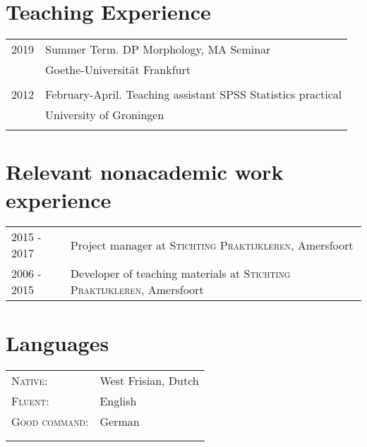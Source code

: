 \documentclass[12pt]{article}
\begin{document}
\section{Teaching Experience}
\begin{tabular}{p{3cm}l}
	\textsc{2019} & Summer Term. DP Morphology, MA Seminar\\
	& Goethe-Universität Frankfurt\\\multicolumn{2}{c}{} \\
	\textsc{2012} & February-April. Teaching assistant SPSS Statistics practical\\
	& University of Groningen\\\multicolumn{2}{c}{} \\
\end{tabular}

\section{Relevant nonacademic work experience}
\begin{tabular}{p{3cm}l}
\textsc{2015 - 2017} & Project manager at \textsc{Stichting Praktijkleren}, Amersfoort\\
\textsc{2006 - 2015} & Developer of teaching materials at \textsc{Stichting Praktijkleren}, Amersfoort\\
\end{tabular}

\section{Languages}
\begin{tabular}{p{3cm}l}
\textsc{Native}: &West Frisian, Dutch\\
\textsc{Fluent}: &English\\
\textsc{Good command}: &German\\&\\&\\
\end{tabular}
\end{document}
